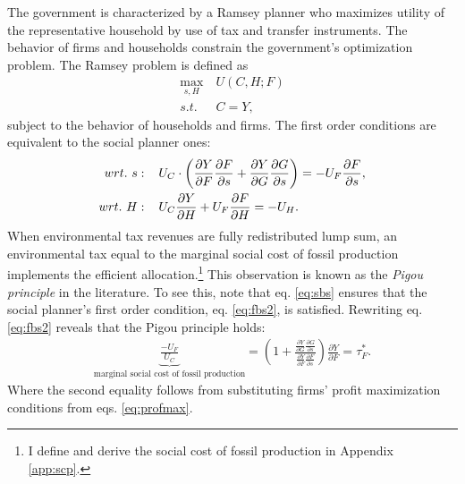 The government is characterized by a Ramsey planner who maximizes utility of the representative household by use of tax and transfer instruments. The behavior of firms and households constrain the government's optimization problem. 
The Ramsey problem is defined as
\begin{align*}
\underset{s, H}{\max}\ & U(C,H; F)\\ s.t.\ \ &  C=Y,
\end{align*}
subject to the behavior of households and firms.
The first order conditions are equivalent to the social planner ones:
\begin{align}
wrt.\ s:\hspace{4mm} & U_C\cdot\left(\frac{\partial Y}{\partial F}\frac{\partial F}{\partial s}+\frac{\partial Y}{\partial G}\frac{\partial G}{\partial s}\right)=-U_F\frac{\partial F}{\partial s}, \label{eq:sbs}
\\
wrt.\ H:\hspace{4mm} & U_C\frac{\partial Y}{\partial H}+U_F\frac{\partial F}{\partial H}=-U_H\label{eq:sbh}. 
\end{align}
When environmental tax revenues are fully redistributed lump sum, an environmental tax equal to the marginal social cost of fossil production implements the efficient allocation.\footnote{ I define and derive the social cost of fossil production in Appendix \ref{app:scp}.} This observation is known as the \textit{Pigou principle} in the literature. 
To see this, note that eq. \eqref{eq:sbs} ensures that the social planner's first order condition, eq. \eqref{eq:fbs2}, is satisfied. 
Rewriting eq. \eqref{eq:fbs2} reveals that the Pigou principle holds: %
\begin{align*}
\underbrace{\frac{-U_F}{U_C}}_{\text{marginal social cost of fossil production}}=\left(1+\frac{\frac{\partial Y}{\partial G}\frac{\partial G}{\partial s}}{\frac{\partial Y}{\partial F}\frac{\partial F}{\partial s}}\right)\frac{\partial Y}{\partial F}=\tau^*_F.
\end{align*}
Where the second equality follows from substituting firms' profit maximization conditions from eqs. \eqref{eq:profmax}.


